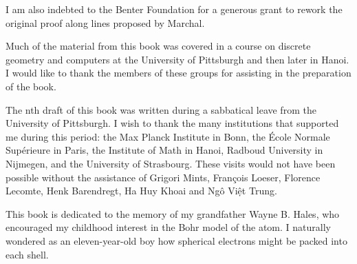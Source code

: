 I am also indebted to the Benter Foundation for a generous grant to rework the original
proof along lines proposed by Marchal.

Much of the material from this book was covered
in a course on discrete geometry and computers at the University of
Pittsburgh and then later %
in Hanoi.  I would like to thank the members of these
groups for assisting in the preparation of the book.

The nth draft of this book was written during a sabbatical leave from the
University of Pittsburgh.  I wish to thank the many institutions that
supported me during this period: the Max Planck Institute in Bonn, the
\'Ecole Normale Sup\'erieure in Paris, the Institute of Math in Hanoi, Radboud
University in Nijmegen, and the University of Strasbourg.  These visits would not
have been possible without the assistance of  Grigori Mints, Fran\c{c}ois Loeser,
Florence Lecomte, Henk Barendregt, Ha Huy Khoai and Ng\^o Vi\d{\^e}t Trung.

This book is dedicated to the memory of my grandfather Wayne B. Hales,
who encouraged my childhood interest in the Bohr model of the atom.  I
naturally wondered as an eleven-year-old boy how spherical electrons might
be packed into each shell.

